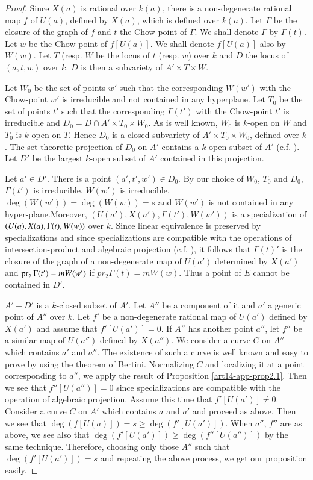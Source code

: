 \begin{proof}
Since $X(a)$ is rational over $k(a)$, there is a non-degenerate rational map $f$ of $U(a)$, defined by $X(a)$, which is defined over $k(a)$. Let $\Gamma$ be the closure of the graph of $f$ and $t$ the Chow-point of $\Gamma$. We shall denote $\Gamma$ by $\Gamma(t)$. Let $w$ be the Chow-point of $f[U(a)]$. We shall denote $f[U(a)]$ also by $W(w)$. Let $T$ (resp. $W$ be the locus of $t$ (resp. $w$) over $k$ and $D$ the locus of $(a,t,w)$ over $k$. $D$ is then a subvariety of $A'\times T\times W$.

Let $W_{0}$ be the set of points $w'$ such that the corresponding $W(w')$ with the Chow-point $w'$ is irreducible and not contained in any hyperplane. Let $T_{0}$ be the set of points $t'$ such that the corresponding $\Gamma(t')$ with the Chow-point $t'$ is irreducible and $D_{0}=D\cap A'\times T_{0}\times W_{0}$. As is well known, $W_{0}$ is $k$-open on $W$ and $T_{0}$ is $k$-open on $T$. Hence $D_{0}$ is a closed subvariety of $A'\times T_{0}\times W_{0}$, defined over $k$. The set-theoretic projection of $D_{0}$ on $A'$ contains a $k$-open subset of $A'$ (c.f. \cite{art14-key28}). Let $D'$ be the largest $k$-open subset of $A'$ contained in this projection.

Let $a'\in D'$. There is a point $(a',t',w')\in D_{0}$. By our choice of $W_{0}$, $T_{0}$ and $D_{0}$, $\Gamma(t')$ is irreducible, $W(w')$ is irreducible, $\deg(W(w'))=\deg(W(w))=s$ and $W(w')$ is not contained in any hyper-plane.\pageoriginale Moreover, $(U(a'), X(a'),\Gamma(t'),W(w'))$ is a specialization of $(U(a), X(a),\Gamma(t),\break W(w))$ over $k$. Since linear equivalence is preserved by specializations and since specializations are compatible with the operations of intersection-product and algebraic projection (c.f. \cite{art14-key24}), it follows that $\Gamma(t)'$ is the closure of the graph of a non-degenerate map of $U(a')$ determined by $X(a')$ and $\operatorname{\mathrm{pr}}_{2}\Gamma(t')=mW(w')$ if $pr_{2}\Gamma(t)=mW(w)$. Thus a point of $E$ cannot be contained in $D'$.

$A'-D'$ is a $k$-closed subset of $A'$. Let $A''$ be a component of it and $a'$ a generic point of $A''$ over $k$. Let $f'$ be a non-degenerate rational map of $U(a')$ defined by $X(a')$ and assume that $f'[U(a')]=0$. If $A''$ has another point $a''$, let $f''$ be a similar map of $U(a'')$ defined by $X(a'')$. We consider a curve $C$ on $A''$ which contains $a'$ and $a''$. The existence of such a curve is well known and easy to prove by using the theorem of Bertini. Normalizing $C$ and localizing it at a point corresponding to $a''$, we apply the result of Proposition \ref{art14-app-prop2.1}. Then we see that $f''[U(a'')]=0$ since specializations are compatible with the operation of algebraic projection. Assume this time that $f'[U(a')]\neq 0$. Consider a curve $C$ on $A'$ which contains $a$ and $a'$ and proceed as above. Then we see that $\deg(f[U(a)])=s\geq \deg(f'[U(a')])$. When $a''$, $f''$ are as above, we see also that $\deg(f'[U(a')])\geq \deg (f''[U(a'')])$ by the same technique. Therefore, choosing only those $A''$ such that $\deg(f'[U(a')])=s$ and repeating the above process, we get our proposition easily.
\end{proof}

